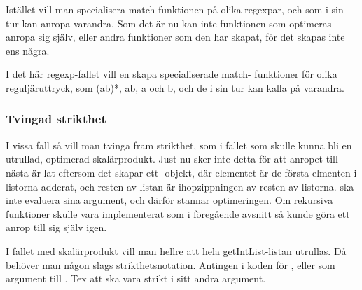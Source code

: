\documentclass[Rapport]{subfiles}
\begin{document}
    Istället vill man specialisera match-funktionen på olika regexpar, och
som i sin tur kan anropa varandra. Som det är nu kan inte funktionen som
optimeras anropa sig själv, eller andra funktioner som den har skapat,
för det skapas inte ens några.

    I det här regexp-fallet vill en skapa specialiserade match-
funktioner för olika reguljäruttryck, som (ab)*, ab, a och b, och de i sin tur
kan kalla på varandra.

\subsubsection{Tvingad strikthet}

I vissa fall så vill man tvinga fram strikthet, som i fallet 
 som skulle kunna bli en utrullad,
optimerad skalärprodukt. Just nu sker inte detta för att anropet till nästa
 är lat eftersom det skapar ett -objekt, där elementet är de första
elmenten i listorna adderat, och resten av listan är ihopzippningen av resten
av listorna.  ska inte evaluera sina argument, och därför stannar
optimeringen. Om rekursiva funktioner skulle vara implementerat som i föregående
avsnitt så kunde göra ett anrop till sig själv igen.

    I fallet med skalärprodukt vill man hellre att hela getIntList-listan 
utrullas. Då behöver man någon slags strikthetsnotation. Antingen i koden 
för , eller som argument till . Tex att  ska vara strikt i 
sitt andra argument.
\end{document}
